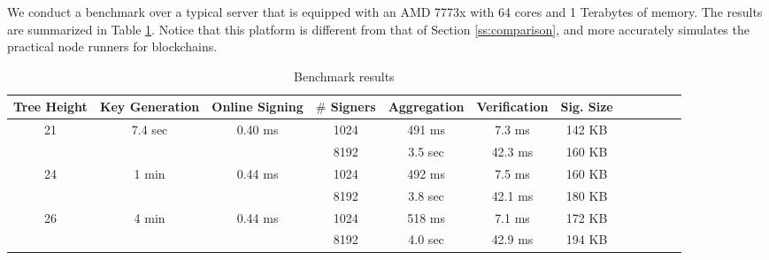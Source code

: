 We conduct a benchmark over a typical server that is equipped with an AMD 7773x with
64 cores and 1 Terabytes of memory.
The results are summarized in Table \ref{tab:bench_results}.
Notice that this platform is different from that of Section \ref{ss:comparison},
and more accurately simulates the practical node runners for blockchains.

\begin{table}[t]\centering
  \begin{tabular}{|c|c|c|c|c|c|c|c|c||c|c|c|}\hline
      Tree Height         & Key Generation            & Online Signing            & $\#$ Signers  
                                                                                            &  Aggregation & Verification  & Sig. Size  \\ \hline\hline
      \multirow{2}{*}{21} & \multirow{2}{*}{7.4 sec}  & \multirow{2}{*}{0.40 ms}  & 1024    &   491 ms     &  7.3 ms       & 142 KB     \\\cline{4-7}
                          &                           &                           & 8192    &   3.5 sec    &  42.3 ms      & 160 KB     \\\hline\hline

      \multirow{2}{*}{24} & \multirow{2}{*}{1 min}    & \multirow{2}{*}{0.44 ms}  & 1024    &   492 ms     &  7.5 ms       & 160 KB     \\\cline{4-7}
                          &                           &                           & 8192    &   3.8 sec    &  42.1 ms      & 180 KB     \\\hline\hline

      \multirow{2}{*}{26} & \multirow{2}{*}{  4 min}  & \multirow{2}{*}{0.44 ms}  & 1024    &   518 ms     &  7.1 ms       & 172 KB     \\\cline{4-7}
                          &                           &                           & 8192    &   4.0 sec    &  42.9 ms      & 194 KB     \\\hline

  \end{tabular}\\
  \caption{Benchmark results}
  \label{tab:bench_results}
\end{table}

